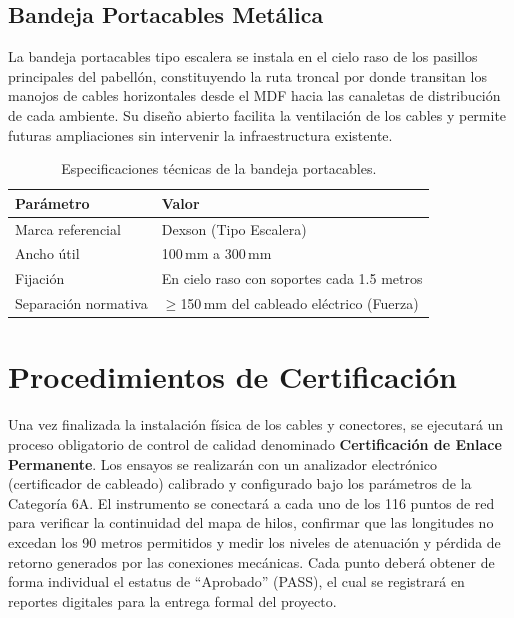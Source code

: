 \subsection{Bandeja Portacables Metálica}
La bandeja portacables tipo escalera se instala en el cielo raso de los pasillos principales del pabellón, constituyendo la ruta troncal por donde transitan los manojos de cables horizontales desde el MDF hacia las canaletas de distribución de cada ambiente. Su diseño abierto facilita la ventilación de los cables y permite futuras ampliaciones sin intervenir la infraestructura existente.

\begin{table}[H]
\centering
\caption{Especificaciones técnicas de la bandeja portacables.}
\label{tab:spec_bandeja}
\begin{tabular}{lp{9cm}}
\hline
\textbf{Parámetro} & \textbf{Valor} \\
\hline
Marca referencial & Dexson (Tipo Escalera) \\
Ancho útil & 100\,mm a 300\,mm \\
Fijación & En cielo raso con soportes cada 1.5 metros \\
Separación normativa & $\ge$150\,mm del cableado eléctrico (Fuerza) \\
\hline
\end{tabular}
\end{table}

\section{Procedimientos de Certificación}
Una vez finalizada la instalación física de los cables y conectores, se ejecutará un proceso obligatorio de control de calidad denominado \textbf{Certificación de Enlace Permanente}.
Los ensayos se realizarán con un analizador electrónico (certificador de cableado) calibrado y configurado bajo los parámetros de la Categoría 6A.
El instrumento se conectará a cada uno de los 116 puntos de red para verificar la continuidad del mapa de hilos, confirmar que las longitudes no excedan los 90 metros permitidos y medir los niveles de atenuación y pérdida de retorno generados por las conexiones mecánicas.
Cada punto deberá obtener de forma individual el estatus de ``Aprobado'' (PASS), el cual se registrará en reportes digitales para la entrega formal del proyecto.